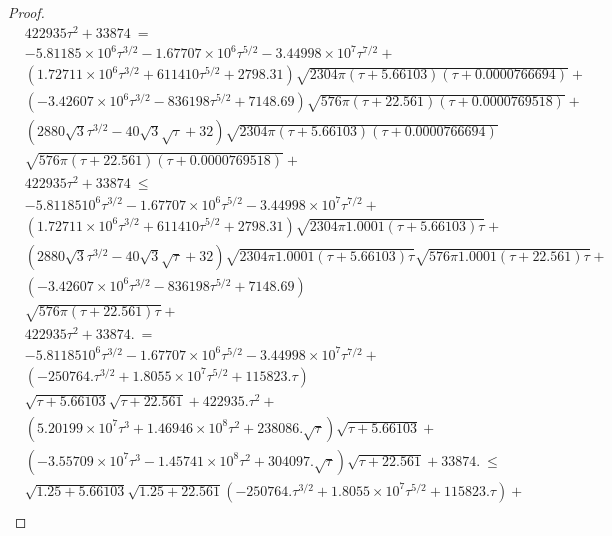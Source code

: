 \documentclass{article}
\renewcommand{\leq}{\leqslant}
\begin{document}
\begin{proof}
\begin{align}
&422935 \tau^2+33874\ = \\ \nonumber
&-5.81185\times 10^6 \tau^{3/2}-1.67707\times 10^6 \tau^{5/2}-3.44998\times 10^7 \tau^{7/2}+\\ \nonumber
&\left(1.72711\times 10^6 \tau^{3/2}+611410 \tau^{5/2}+2798.31\right) \sqrt{2304 \pi  (\tau+5.66103) (\tau+0.0000766694)}+\\ \nonumber 
&\left(-3.42607\times 10^6 \tau^{3/2}-836198 \tau^{5/2}+7148.69\right) \sqrt{576 \pi  (\tau+22.561) (\tau+0.0000769518)}+\\ \nonumber 
&\left(2880 \sqrt{3} \tau^{3/2}-40 \sqrt{3} \sqrt{\tau}+32\right) \sqrt{2304 \pi  (\tau+5.66103) (\tau+0.0000766694)}\\ \nonumber 
& \sqrt{576 \pi  (\tau+22.561) (\tau+0.0000769518)}+\\ \nonumber 
&422935 \tau^2+33874\ \leq \\ \nonumber 
&-5.81185 10^6 \tau^{3/2}-1.67707\times 10^6 \tau^{5/2}-3.44998\times 10^7 \tau^{7/2}+\\ \nonumber 
&\left(1.72711\times 10^6 \tau^{3/2}+611410 \tau^{5/2}+2798.31\right) \sqrt{2304 \pi  1.0001 (\tau+5.66103) \tau}+\\ \nonumber 
&\left(2880 \sqrt{3} \tau^{3/2}-40 \sqrt{3} \sqrt{\tau}+32\right) \sqrt{2304 \pi  1.0001 (\tau+5.66103) \tau} \sqrt{576 \pi  1.0001 (\tau+22.561) \tau}+\\ \nonumber
&\left(-3.42607\times 10^6 \tau^{3/2}-836198 \tau^{5/2}+7148.69\right) \\ \nonumber 
&\sqrt{576 \pi  (\tau+22.561) \tau}+\\ \nonumber 
&422935 \tau^2+33874.\ = \\ \nonumber &
-5.81185 10^6 \tau^{3/2}-1.67707\times 10^6 \tau^{5/2}-3.44998\times 10^7 \tau^{7/2}+\\ \nonumber 
&\left(-250764. \tau^{3/2}+1.8055\times 10^7 \tau^{5/2}+115823. \tau\right) \\ \nonumber 
&\sqrt{\tau+5.66103} \sqrt{\tau+22.561}+422935. \tau^2+\\ \nonumber 
&\left(5.20199\times 10^7 \tau^3+1.46946\times 10^8 \tau^2+238086. \sqrt{\tau}\right) \sqrt{\tau+5.66103}+\\ \nonumber 
&\left(-3.55709\times 10^7 \tau^3-1.45741\times 10^8 \tau^2+304097. \sqrt{\tau}\right) \sqrt{\tau+22.561}+33874. \ \leq \\ \nonumber
&\sqrt{1.25 +5.66103} \sqrt{1.25 +22.561} \left(-250764. \tau^{3/2}+1.8055\times 10^7 \tau^{5/2}+115823. \tau\right)+\\ \nonumber 

\end{align}
\end{proof}
\end{document}
